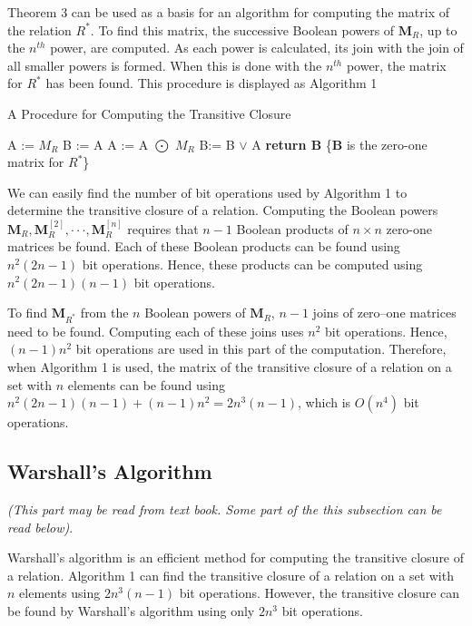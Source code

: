 \documentclass[11pt]{article}
\begin{document}
Theorem 3 can be used as a basis for an algorithm for computing the matrix of the relation $R^*$. To find this matrix, the successive Boolean powers of $\mathbf{M}_R$, up to the $n^{th}$ power, are computed. As each power is calculated, its join with the join of all smaller powers is formed. When this is done with the $n^{th}$ power, the matrix for $R^*$ has been found. This procedure is displayed as Algorithm 1

\begin{algorithm}
\caption{A Procedure for Computing the Transitive Closure}
\begin{algorithmic}[1]
\State A := $M_R$
\State B := A
    \State A := A $\bigodot$ $M_R$
    \State B:= B $\lor$ A
\EndFor
\State \textbf{return B} \{\textbf{B} is the zero-one matrix for $R^*$\}
\EndProcedure
\end{algorithmic}
\end{algorithm}

We can easily find the number of bit operations used by Algorithm 1 to determine the transitive closure of a relation. Computing the Boolean powers $\textbf{M}_R, \textbf{M}_R^{[2]}, \cdot \cdot \cdot, \textbf{M}_R^{[n]}$ requires that $n-1$ Boolean products of $n \times n$ zero-one matrices be found. Each of these Boolean products can be found using $n^2(2n-1)$ bit operations. Hence, these products can be computed using $n^2(2n-1)(n-1)$ bit operations.

To find $\textbf{M}_{R^*}$ from the $n$ Boolean powers of $\textbf{M}_R$, $n-1$ joins of zero–one matrices need to be found. Computing each of these joins uses $n^2$ bit operations. Hence, $(n-1)n^2$ bit operations are used in this part of the computation. Therefore, when Algorithm 1 is used, the matrix of the transitive closure of a relation on a set with $n$ elements can be found using $n^2(2n-1)(n-1) + (n-1)n^2 = 2n^3(n-1)$, which is $O(n^4)$ bit operations.

\newpage
\subsection{Warshall’s Algorithm}

\textit{(This part may be read from text book. Some part of the this subsection can be read below)}.

\noindent Warshall’s algorithm is an efficient method for computing the transitive closure of a relation. Algorithm 1 can find the transitive closure of a relation on a set with $n$ elements using $2n^3(n−1)$ bit operations. However, the transitive closure can be found by Warshall’s algorithm using only $2n^3$ bit operations.
\end{document}
